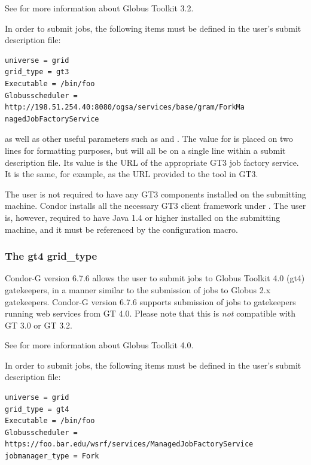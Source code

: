 See
for more information about Globus Toolkit 3.2.

In order to submit   jobs,
the following items must be defined in the user's
submit description file:
\footnotesize
\begin{verbatim}
universe = grid
grid_type = gt3
Executable = /bin/foo
Globusscheduler = http://198.51.254.40:8080/ogsa/services/base/gram/ForkMa
nagedJobFactoryService
\end{verbatim}
\normalsize

as well as other useful parameters such as
 and .
The value for  is placed on two lines for
formatting purposes, but will all be on a single line within
a submit description file.
Its value is the URL of the appropriate GT3 job factory service.
It is the same, for example,
as the URL provided to the  tool in GT3.

The user is not required to have any GT3 components installed on the
submitting machine.
Condor installs all the necessary GT3 client framework under 
.
The user is, however, required to
have Java 1.4 or higher installed on the submitting machine,
and it must be referenced by the 
 configuration macro.


\subsubsection{\label{sec:Using-gt4}The gt4 grid\_type}

Condor-G version 6.7.6 allows the user to submit jobs
to Globus Toolkit 4.0 (gt4) gatekeepers,
in a manner similar to the submission of
jobs to Globus 2.x gatekeepers.
Condor-G version 6.7.6 supports submission of jobs to gatekeepers
running web services from GT 4.0.
Please note that this is \emph{not} compatible with GT 3.0 or GT 3.2.

See
for more information about Globus Toolkit 4.0.

In order to submit   jobs,
the following items must be defined in the user's
submit description file:
\footnotesize
\begin{verbatim}
universe = grid
grid_type = gt4
Executable = /bin/foo
Globusscheduler = https://foo.bar.edu/wsrf/services/ManagedJobFactoryService
jobmanager_type = Fork
\end{verbatim}
\normalsize

